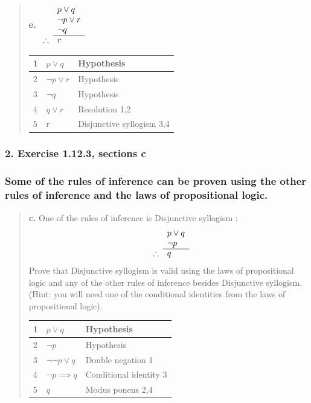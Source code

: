 \documentclass[11pt, oneside]{article}
\begin{document}
\begin{quote}
    \textbf{e. }
    \(
    \begin{array}{rl}
      & p\lor q \\
      & \neg p \lor r \\
      & \neg q \\
      \cline{2-2}
    \therefore & r  
    \end{array}
    \)  
    
    \begin{tabular}{|p{0.5cm}|p{5cm}|p{5cm}|}
        \hline
        1 & $p \lor q$ & Hypothesis \\
        \hline
        2 & $\neg p \lor r$ & Hypothesis \\
        \hline
        3 & $\neg q$ & Hypothesis \\
        \hline
        4 & $q \lor r$ & Resolution 1,2 \\
        \hline
        5 & r & Disjunctive syllogism 3,4 \\
        \hline
    \end{tabular}
\end{quote}

\subsubsection*{2. Exercise 1.12.3, sections c}

\subsubsection*{Some of the rules of inference can be proven using the other rules of inference and the laws of propositional logic.}

\begin{quote}
    \textbf{c. }One of the rules of inference is Disjunctive syllogism :
    \[
    \begin{array}{rl}
      & p \lor q \\
      & \neg p \\
      \cline{2-2}
    \therefore & q 
    \end{array}
    \]  
    Prove that Disjunctive syllogism is valid using the laws of propositional logic and any of the other rules of inference besides Disjunctive syllogism. (Hint: you will need one of the conditional identities from the laws of propositional logic).
    
    \begin{tabular}{|p{1cm}|p{5cm}|p{5cm}|}
        \hline
        1 & $p \lor q$ & Hypothesis \\
        \hline
        2 & $\neg p$ & Hypothesis \\
        \hline
        3 & $\neg \neg p \lor q$ & Double negation 1 \\
        \hline
        4 & $\neg p \implies q$ & Conditional identity 3 \\
        \hline
        5 & $q$ & Modus ponens 2,4 \\
        \hline
    \end{tabular}
\end{quote}
\end{document}

